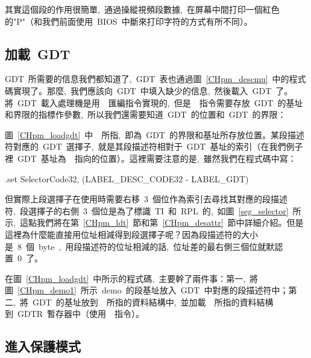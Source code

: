 \label{CHpm_demo1}

其實這個段的作用很簡單,~通過操縱視頻段數據,~在屏幕中間打印一個紅色的"P"（和我們前面使用~BIOS~中斷來打印字符的方式有所不同）。

\subsection{加載~GDT} \label{CHpm_secloadgdt}

GDT~所需要的信息我們都知道了,~GDT~表也通過圖~\ref{CHpm_descmu}~中的程式碼實現了。那麼,~我們應該向~GDT~中填入缺少的信息,~然後載入~GDT~了。將~GDT~載入處理機是用~~匯編指令實現的,~但是~~指令需要存放~GDT~的基址和界限的指標作參數,~所以我們還需要知道~GDT~的位置和~GDT~的界限：

\label{CHpm_loadgdt}

圖~\ref{CHpm_loadgdt}~中~~所指,~即為~GDT~的界限和基址所存放位置。某段描述符對應的~GDT~選擇子,~就是其段描述符相對于~GDT~基址的索引（在我們例子裡~GDT~基址為~~指向的位置）。這裡需要注意的是,~雖然我們在程式碼中寫：

\begin{Command}
.set SelectorCode32, (LABEL_DESC_CODE32 - LABEL_GDT)
\end{Command}
但實際上段選擇子在使用時需要右移~3~個位作為索引去尋找其對應的段描述符,~段選擇子的右側~3~個位是為了標識~TI~和~RPL~的,~如圖~\ref{seg_selector}~所示,~這點我們將在第~\ref{CHpm_ldt}~節和第~\ref{CHpm_desattr}~節中詳細介紹。但是這裡為什麼能直接用位址相減得到段選擇子呢？因為段描述符的大小是~8~個~byte~,~用段描述符的位址相減的話,~位址差的最右側三個位就默認置~0~了。

在圖~\ref{CHpm_loadgdt}~中所示的程式碼,~主要幹了兩件事：第一,~將圖~\ref{CHpm_demo1}~所示~demo~的段基址放入~GDT~中對應的段描述符中；第二,~將~GDT~的基址放到~~所指的資料結構中,~並加載~~所指的資料結構到~GDTR~暫存器中（使用~~指令）。

\subsection{進入保護模式}

